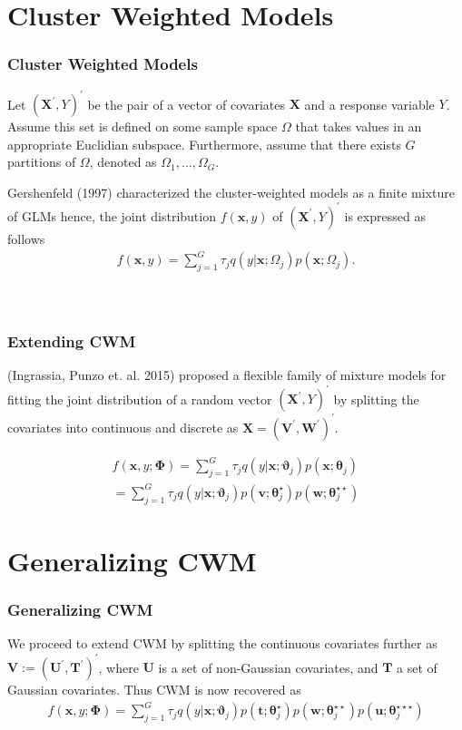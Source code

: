\documentclass{beamer}
\begin{document}

\section{Cluster Weighted Models}


\begin{frame}
\frametitle{Cluster Weighted Models}
Let $(\bm{X^{'}}, Y)^{'}$  be the pair of a vector of covariates  $\bm{X}$ and a response variable $Y$. Assume this set is defined on some sample space $\Omega$ that takes values in an appropriate Euclidian subspace. Furthermore, assume that there exists $G$ partitions of $\Omega$, denoted as $\Omega_1, \ldots, \Omega_G$. \newline

Gershenfeld (1997) characterized the cluster-weighted models as a finite mixture of GLMs hence, the joint distribution $f(\bm x, y)$ of $(\bm{X^{'}}, Y )^{'}$  is expressed as follows
 \begin{align}
 f(\bm x, y)= \sum_{j=1}^{G} \tau_j q(y|\bm{x};\Omega_j)p(\bm{x};\Omega_j).
\label{eq1}
\end{align}
\\~\\
\end{frame}

\begin{frame}
\frametitle{Extending CWM}
(Ingrassia, Punzo et. al. 2015) proposed a flexible family of mixture models for fitting the joint distribution of a random vector $(\bm{X^{'}}, Y)^{'}$ by splitting the covariates into continuous and discrete as $ \bm{X}=(\bm{V^{'}},  \bm{W^{'}})^{'}$.

\begin{align*}
 f(\bm{x}, y; \bm{\Phi})= \sum_{j=1}^{G} \tau_j q(y|\bm{x};\bm{\vartheta}_j)p(\bm{x};\bm{\theta}_j)\\ 
= \sum_{j=1}^{G} \tau_j q(y|\bm{x};\bm{\vartheta}_j)p(\bm{v}; \bm{\theta}_j^{\star})p(\bm{w};\bm{\theta}_j^{\star\star})
 \end{align*}
\end{frame}


\section{Generalizing CWM}
\begin{frame}
\frametitle{Generalizing CWM}
We proceed to extend CWM by splitting the  continuous covariates further as $\bm{V}:=(\bm U^{'}, \bm T^{'})^{'}$, where $\bm{U}$ is a set of non-Gaussian covariates, and $\bm{T}$ a set of Gaussian  covariates.  Thus CWM is now recovered as
\begin{align*}
 f(\bm x, y; \bm{\Phi})= \sum_{j=1}^{G} \tau_j q(y|\bm{x};\bm{\vartheta}_j)p(\bm{t};\bm{\theta}_j^{\star})p(\bm{w};\bm{\theta}_j^{\star\star})p(\bm{u};\bm{\theta}_j^{\star\star\star})
\end{align*}
\end{frame}
\end{document}
